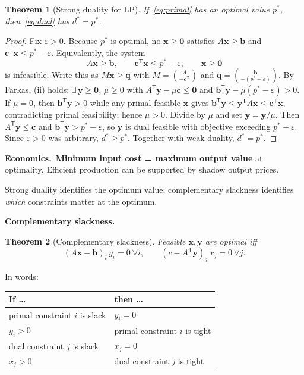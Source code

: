 \documentclass[11pt,a4paper]{article}
\newtheorem{theorem}{Theorem}
\newcommand{\econ}[1]{\medskip\noindent\textbf{Economics.}\ #1\medskip}
\begin{document}
\begin{theorem}[Strong duality for LP]
If~\eqref{eq:primal} has an optimal value $p^*$, then~\eqref{eq:dual} has $d^*=p^*$.
\end{theorem}

\begin{proof}
Fix $\varepsilon>0$.
Because $p^*$ is optimal, no $\mathbf{x}\ge\mathbf{0}$ satisfies
$A\mathbf{x}\ge\mathbf{b}$ and $\mathbf{c}^{\mathsf T}\mathbf{x}\le p^*-\varepsilon$.
Equivalently, the system
\[
  A\mathbf{x}\ge\mathbf{b},\qquad
  \mathbf{c}^{\mathsf T}\mathbf{x}\le p^*-\varepsilon,\qquad
  \mathbf{x}\ge\mathbf{0}
\]
is infeasible.
Write this as $M\mathbf{x}\ge\mathbf{q}$ with
$M=\binom{A}{-\mathbf{c}^{\mathsf T}}$ and $\mathbf{q}=\binom{\mathbf{b}}{-(p^*-\varepsilon)}$.
By Farkas, (ii) holds: $\exists\,\mathbf{y}\ge\mathbf{0}$, $\mu\ge 0$ with
$A^{\mathsf T}\mathbf{y}-\mu\mathbf{c}\le\mathbf{0}$ and $\mathbf{b}^{\mathsf T}\mathbf{y}-\mu(p^*-\varepsilon)>0$.
If $\mu=0$, then $\mathbf{b}^{\mathsf T}\mathbf{y}>0$ while any primal feasible $\mathbf{x}$ gives
$\mathbf{b}^{\mathsf T}\mathbf{y}\le\mathbf{y}^{\mathsf T}A\mathbf{x}\le\mathbf{c}^{\mathsf T}\mathbf{x}$,
contradicting primal feasibility; hence $\mu>0$.
Divide by $\mu$ and set $\tilde{\mathbf{y}}=\mathbf{y}/\mu$.
Then $A^{\mathsf T}\tilde{\mathbf{y}}\le\mathbf{c}$ and $\mathbf{b}^{\mathsf T}\tilde{\mathbf{y}}>p^*-\varepsilon$,
so $\tilde{\mathbf{y}}$ is dual feasible with objective exceeding $p^*-\varepsilon$.
Since $\varepsilon>0$ was arbitrary, $d^*\ge p^*$.
Together with weak duality, $d^*=p^*$.
\end{proof}

\econ{\textbf{Minimum input cost = maximum output value} at optimality.
Efficient production can be supported by shadow output prices.}

Strong duality identifies the optimum value; complementary slackness identifies \emph{which} constraints matter at the optimum.

\textbf{Complementary slackness.}

\begin{theorem}[Complementary slackness]
Feasible $\mathbf{x},\mathbf{y}$ are optimal iff
\[
  (A\mathbf{x}-\mathbf{b})_i\,y_i = 0\ \forall i,
  \qquad
  (c-A^{\mathsf T}\mathbf{y})_j\,x_j = 0\ \forall j.
\]
\end{theorem}

In words:
\begin{center}
\small
\renewcommand{\arraystretch}{1.15}
\begin{tabular}{ll}
\toprule
\textbf{If \ldots} & \textbf{then \ldots} \\
\midrule
primal constraint $i$ is slack & $y_i=0$ \\
$y_i>0$ & primal constraint $i$ is tight \\
dual constraint $j$ is slack & $x_j=0$ \\
$x_j>0$ & dual constraint $j$ is tight \\
\bottomrule
\end{tabular}
\end{center}
\end{document}
